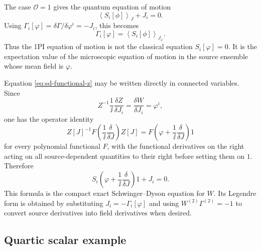 The case \(\mathcal O=1\) gives the quantum equation of motion
\[
  \left\langle S_i[\phi]\right\rangle_J+J_i=0.
\]
Using \(\Gamma_i[\varphi]=\delta\Gamma/\delta\varphi^i=-J_i\), this becomes
\begin{equation}
  \Gamma_i[\varphi]
  =
  \left\langle S_i[\phi]\right\rangle_{J_\varphi}.
  \label{eq:sd-1pi-equation-of-motion}
\end{equation}
Thus the 1PI equation of motion is not the classical equation
\(S_i[\varphi]=0\).  It is the expectation value of the microscopic equation
of motion in the source ensemble whose mean field is \(\varphi\).

Equation \eqref{eq:sd-functional-z} may be written directly in connected
variables.  Since
\[
  Z^{-1}\frac1{\ii}\frac{\delta Z}{\delta J_i}
  =
  \frac{\delta W}{\delta J_i}
  =
  \varphi^i,
\]
one has the operator identity
\begin{equation}
  Z[J]^{-1}
  F\!\left(\frac1{\ii}\frac{\delta}{\delta J}\right)Z[J]
  =
  F\!\left(\varphi+\frac1{\ii}\frac{\delta}{\delta J}\right)1
  \label{eq:source-derivative-shift-identity}
\end{equation}
for every polynomial functional \(F\), with the functional derivatives on the
right acting on all source-dependent quantities to their right before setting
them on \(1\).  Therefore
\begin{equation}
  S_i\!\left(\varphi+\frac1{\ii}\frac{\delta}{\delta J}\right)1
  +J_i=0 .
  \label{eq:sd-connected-functional-form}
\end{equation}
This formula is the compact exact Schwinger--Dyson equation for \(W\).  Its
Legendre form is obtained by substituting \(J_i=-\Gamma_i[\varphi]\) and
using \(W^{(2)}\Gamma^{(2)}=-1\) to convert source derivatives into field
derivatives when desired.

\subsection*{Quartic scalar example}

